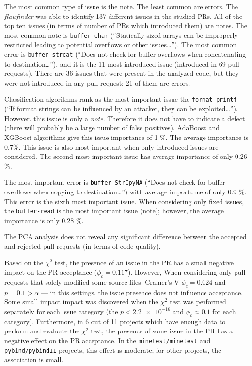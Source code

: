 \documentclass[digital,oneside,oldtable,nolof,nolot,nocover]{fithesis4}
\begin{document}
The most common type of issue is the note. The least common are errors. The
\emph{flawfinder} was able to identify 137 different issues in the studied
PRs. All of the top ten issues (in terms of number of PRs which introduced
them) are notes. The most common note is \texttt{buffer-char} (``Statically-sized
arrays can be improperly restricted leading to potential overflows or other
issues\dots{}''). The most common error is \texttt{buffer-strcat} (``Does not check
for buffer overflows when concatenating to destination\dots{}''), and it is the
11 most introduced issue (introduced in 69 pull requests). There are 36 issues
that were present in the analyzed code, but they were not introduced in any
pull request; 21 of them are errors.

Classification algorithms rank as the most important issue the
\texttt{format-printf} (``If format strings can be influenced by an attacker, they
can be exploited\dots{}''). However, this issue is only a \emph{note}.  Therefore it
does not have to indicate a defect (there will probably be a large number of
false positives). AdaBoost and XGBoost algorithms give this issue importance
of 1 \%. The average importance is 0.7\%.  This issue is also most important
when only introduced issues are considered.  The second most important issue has
average importance of only 0.26 \%.

The most important error is \texttt{buffer-StrCpyNA} (``Does not check for buffer
overflows when copying to destination\dots{}'') with average importance of only
0.9 \%. This error is the sixth most important issue.
When considering only fixed issues, the \texttt{buffer-read} is the most important issue (note);
however, the average importance is only 0.28 \%.

The PCA analysis does not reveal any significant difference between the accepted
and rejected pull requests (in terms of code quality).

Based on the \(\chi^2\) test, the presence of an issue in the PR has a small negative impact
on the PR acceptance (\(\phi_c = 0.117\)).
However, When considering only pull requests that solely modified some source files,
Cramer's V \(\phi_c = 0.024\) and \(p = 0.1 > \alpha\) --- in this settings, the issue presence
does not influence acceptance.
Some small impact impact was discovered when the \(\chi^2\) test was performed separately for
each issue category (the \(p < \num{2.2e-16}\) and \(\phi_c \approx 0.1\) for each category).
Furthermore, in 6 out of 11 projects which have enough data to perform and evaluate the \(\chi^2\) test,
the presence of some issue in the PR has a negative effect on the PR acceptance.
In the \texttt{minetest/minetest} and \texttt{pybind/pybind11} projects, this effect is moderate;
for other projects, the association is small.
\end{document}
